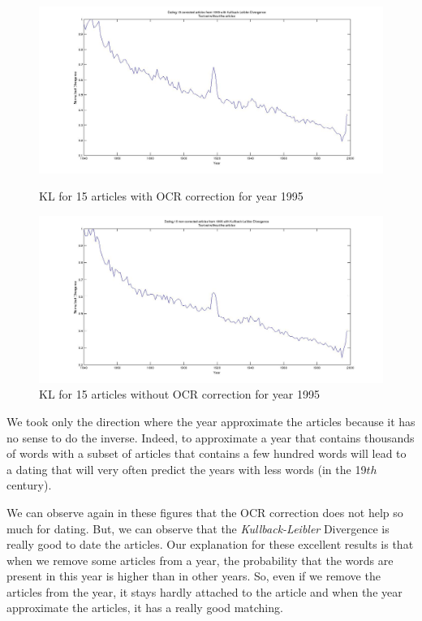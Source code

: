 \begin{figure}[h!]
    \begin{minipage}[b]{0.48\linewidth}
        \includegraphics[scale=0.15]{Pictures/date_articles/kullback_leibler/15articles_1995_KL_years_simulate_articles_corrected_without_articles.jpg}
        \caption{KL for 15 articles with OCR correction for year 1995}
        \label{ArticleKL-C1995}
    \end{minipage}\hfill
    \begin{minipage}[b]{0.5\linewidth}
        \includegraphics[scale=0.15]{Pictures/date_articles/kullback_leibler/15articles_1995_KL_years_simulate_articles_without_correction_without_articles.jpg}
        \caption{KL for 15 articles without OCR correction for year 1995}
        \label{ArticleKL-N1995}
    \end{minipage}\hfill
\end{figure}

We took only the direction where the year approximate the articles because it has no sense to do the inverse. Indeed, to approximate a year that contains thousands of words with a subset of articles that contains a few hundred words will lead to a dating that will very often predict the years with less words (in the 19$th$ century).

We can observe again in these figures that the OCR correction does not help so much for dating. But, we can observe that the \emph{Kullback-Leibler} Divergence is really good to date the articles. Our explanation for these excellent results is that when we remove some articles from a year, the probability that the words are present in this year is higher than in other years. So, even if we remove the articles from the year, it stays hardly attached to the article and when the year approximate the articles, it has a really good matching.